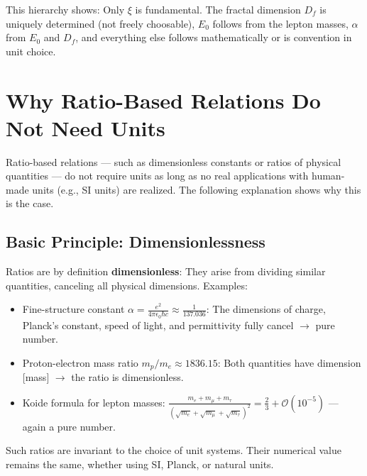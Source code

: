 	This hierarchy shows: Only $\xi$ is fundamental. The fractal dimension $D_f$ is uniquely determined (not freely choosable), $E_0$ follows from the lepton masses, $\alpha$ from $E_0$ and $D_f$, and everything else follows mathematically or is convention in unit choice.
	
	\section{Why Ratio-Based Relations Do Not Need Units}
	Ratio-based relations --- such as dimensionless constants or ratios of physical quantities --- do not require units as long as no real applications with human-made units (e.g., SI units) are realized. The following explanation shows why this is the case.
	
	\subsection{Basic Principle: Dimensionlessness}
	Ratios are by definition \textbf{dimensionless}: They arise from dividing similar quantities, canceling all physical dimensions.
	Examples:
	\begin{itemize}
		\item Fine-structure constant $\alpha = \frac{e^2}{4\pi \epsilon_0 \hbar c} \approx \frac{1}{137.036}$:
		The dimensions of charge, Planck's constant, speed of light, and permittivity fully cancel $\to$ pure number.
		\item Proton-electron mass ratio $m_p / m_e \approx 1836.15$:
		Both quantities have dimension [mass] $\to$ the ratio is dimensionless.
		\item Koide formula for lepton masses:
		$\frac{m_e + m_\mu + m_\tau}{(\sqrt{m_e} + \sqrt{m_\mu} + \sqrt{m_\tau})^2} = \frac{2}{3} + \mathcal{O}(10^{-5})$ --- again a pure number.
	\end{itemize}
	Such ratios are invariant to the choice of unit systems. Their numerical value remains the same, whether using SI, Planck, or natural units.
	
